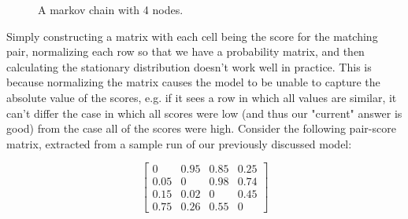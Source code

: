\documentclass{article}
\begin{document}
\begin{figure}[h!]
	\begin{center}
	\end{center}
	\caption{A markov chain with 4 nodes.}
	\label{fig:markov_chain}
\end{figure}

Simply constructing a matrix with each cell being the score for the matching pair, normalizing each row so that we have a probability matrix, and then calculating the stationary distribution doesn't work well in practice. This is because normalizing the matrix causes the model to be unable to capture the absolute value of the scores, e.g. if it sees a row in which all values are similar, it can't differ the case in which all scores were low (and thus our "current" answer is good) from the case all of the scores were high.
Consider the following pair-score matrix, extracted from a sample run of our previously discussed model:

$$
\begin{bmatrix}
0 & 0.95 & 0.85 & 0.25 \\
0.05 & 0 & 0.98 & 0.74 \\
0.15 & 0.02 & 0 & 0.45 \\
0.75 & 0.26 & 0.55 & 0
\end{bmatrix}
$$
\end{document}
